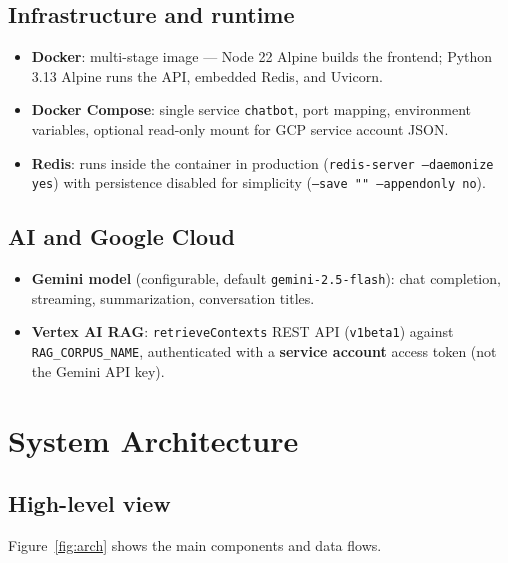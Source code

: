 \documentclass[11pt,a4paper]{article}
\begin{document}
\subsection{Infrastructure and runtime}

\begin{itemize}[noitemsep]
  \item \textbf{Docker}: multi-stage image --- Node 22 Alpine builds the frontend; Python 3.13 Alpine runs the API, embedded Redis, and Uvicorn.
  \item \textbf{Docker Compose}: single service \texttt{chatbot}, port mapping, environment variables, optional read-only mount for GCP service account JSON.
  \item \textbf{Redis}: runs inside the container in production (\texttt{redis-server --daemonize yes}) with persistence disabled for simplicity (\texttt{--save "" --appendonly no}).
\end{itemize}

\subsection{AI and Google Cloud}

\begin{itemize}[noitemsep]
  \item \textbf{Gemini model} (configurable, default \texttt{gemini-2.5-flash}): chat completion, streaming, summarization, conversation titles.
  \item \textbf{Vertex AI RAG}: \texttt{retrieveContexts} REST API (\texttt{v1beta1}) against \texttt{RAG\_CORPUS\_NAME}, authenticated with a \textbf{service account} access token (not the Gemini API key).
\end{itemize}

\section{System Architecture}

\subsection{High-level view}

Figure~\ref{fig:arch} shows the main components and data flows.
\end{document}
